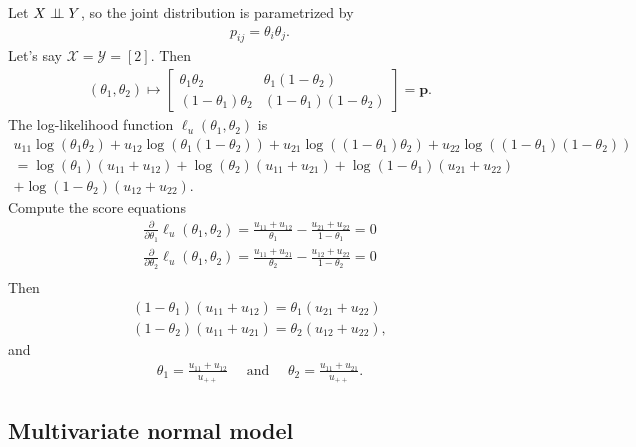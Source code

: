 \begin{eg}
  Let \( X \perp \!\!\! \perp Y \), so the joint distribution is parametrized by 
  \begin{align*}
    p_{ij} = \theta_i \theta_j.
  \end{align*}
  Let's say \( \mathcal{X} = \mathcal{Y} = [2] \). Then 
  \begin{align*}
    (\theta_1, \theta_2) \mapsto \begin{bmatrix}
      \theta_1 \theta_2 & \theta_1 (1 - \theta_2) \\
      (1 - \theta_1) \theta_2 & (1 - \theta_1)(1 - \theta_2)
    \end{bmatrix} = \mathbf p.
  \end{align*}
  The log-likelihood function \(  \ell_u(\theta_1, \theta_2)  \) is 
  \begin{gather*}
   u_{11}\log(\theta_1 \theta_2) + u_{12}\log(\theta_1(1 - \theta_2)) + u_{21} \log((1-\theta_1)\theta_2) + u_{22}\log((1 - \theta_1)(1 - \theta_2)) \\ 
   = \log(\theta_1)(u_{11} + u_{12}) + \log(\theta_2)(u_{11} + u_{21}) + \log(1 - \theta_1)(u_{21} + u_{22})\\ + \log(1 - \theta_2)(u_{12} + u_{22}).
  \end{gather*}
  Compute the score equations 
  \begin{align*}
    \frac{\partial}{\partial\theta_1}\ell_u(\theta_1, \theta_2) = \frac{u_{11} + u_{12}}{\theta_1} - \frac{u_{21} + u_{22}}{1-\theta_1} = 0 \\
    \frac{\partial}{\partial\theta_2}\ell_u(\theta_1, \theta_2) = \frac{u_{11} + u_{21}}{\theta_2} - \frac{u_{12} + u_{22}}{1-\theta_2} = 0 \\
  \end{align*}
  Then 
  \begin{align*}
    (1 - \theta_1)(u_{11} + u_{12}) = \theta_1(u_{21} + u_{22}) \\
    (1 - \theta_2)(u_{11} + u_{21}) = \theta_2(u_{12} + u_{22}),
  \end{align*}
  and 
  \begin{align*}
    \theta_1 = \frac{u_{11} + u_{12}}{u_{++}} \quad \text{ and } \quad \theta_2 = \frac{u_{11} + u_{21}}{u_{++}}.
  \end{align*}
\end{eg}

\subsection*{Multivariate normal model}

